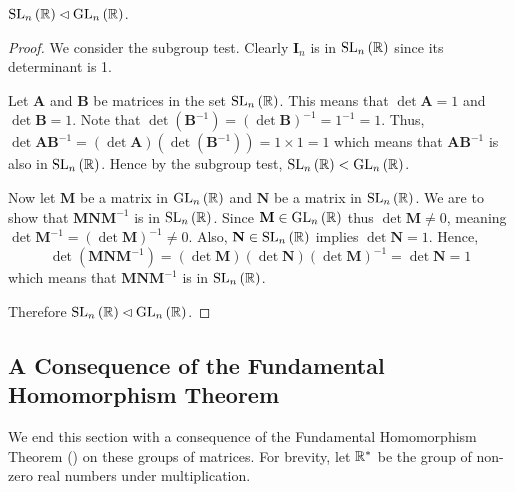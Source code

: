 \begin{proposition}
    $\mathrm{SL}_{n}\left(\mathbb{R}\right) \lhd \mathrm{GL}_{n}\left(\mathbb{R}\right)$.
\end{proposition}
\begin{proof}
    We consider the subgroup test. Clearly $\textbf{I}_n$ is in $\mathrm{SL}_{n}\left(\mathbb{R}\right)$ since its determinant is 1.

    Let \textbf{A} and \textbf{B} be matrices in the set $\mathrm{SL}_{n}\left(\mathbb{R}\right)$. This means that $\det \textbf{A} = 1$ and $\det \textbf{B} = 1$. Note that $\det(\textbf{B}^{-1}) = (\det \textbf{B})^{-1} = 1^{-1} = 1$. Thus, $\det \textbf{AB}^{-1} = (\det \textbf{A})(\det(\textbf{B}^{-1})) = 1 \times 1  = 1$ which means that $\textbf{AB}^{-1}$ is also in $\mathrm{SL}_{n}\left(\mathbb{R}\right)$. Hence by the subgroup test, $\mathrm{SL}_{n}\left(\mathbb{R}\right) < \mathrm{GL}_{n}\left(\mathbb{R}\right)$.

    Now let $\textbf{M}$ be a matrix in $\mathrm{GL}_{n}\left(\mathbb{R}\right)$ and $\textbf{N}$ be a matrix in $\mathrm{SL}_{n}\left(\mathbb{R}\right)$. We are to show that $\textbf{MNM}^{-1}$ is in $\mathrm{SL}_{n}\left(\mathbb{R}\right)$. Since $\textbf{M} \in \mathrm{GL}_{n}\left(\mathbb{R}\right)$ thus $\det \textbf{M} \neq 0$, meaning $\det \textbf{M}^{-1} = (\det \textbf{M})^{-1} \neq 0$. Also, $\textbf{N} \in \mathrm{SL}_{n}\left(\mathbb{R}\right)$ implies $\det \textbf{N} = 1$. Hence,
    \[
        \det\left(\textbf{MNM}^{-1}\right) = (\det \textbf{M})(\det \textbf{N})(\det \textbf{M})^{-1} = \det \textbf{N} = 1
    \]
    which means that $\textbf{MNM}^{-1}$ is in $\mathrm{SL}_{n}\left(\mathbb{R}\right)$.

    Therefore $\mathrm{SL}_{n}\left(\mathbb{R}\right) \lhd \mathrm{GL}_{n}\left(\mathbb{R}\right)$.
\end{proof}

\subsection{A Consequence of the Fundamental Homomorphism Theorem}
We end this section with a consequence of the Fundamental Homomorphism Theorem () on these groups of matrices. For brevity, let $\mathbb{R}^\ast$ be the group of non-zero real numbers under multiplication.

